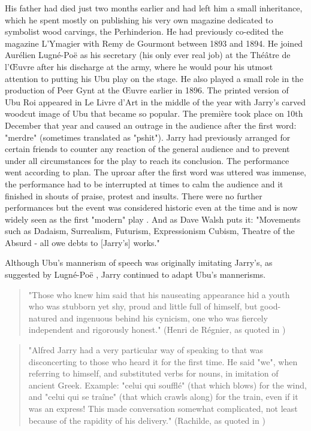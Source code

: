 His father had died just two months earlier and had left him a small inheritance, which he spent mostly on publishing his very own magazine dedicated to symbolist wood carvings, the Perhinderion. He had previously co-edited the magazine L'Ymagier with Remy de Gourmont between 1893 and 1894. He joined Aurélien Lugné-Poë as his secretary (his only ever real job) at the Théâtre de l'Œuvre after his discharge at the army, where he would pour his utmost attention to putting his Ubu play on the stage. He also played a small role in the production of Peer Gynt at the Œuvre earlier in 1896. The printed version of Ubu Roi appeared in Le Livre d'Art in the middle of the year with Jarry's carved woodcut image of Ubu that became so popular. The première took place on 10th December that year and caused an outrage in the audience after the first word: "merdre" (sometimes translated as "pshit"). Jarry had previously arranged for certain friends to counter any reaction of the general audience and to prevent under all circumstances for the play to reach its conclusion. The performance went according to plan. The uproar after the first word was uttered was immense, the performance had to be interrupted at times to calm the audience and it finished in shouts of praise, protest and insults. There were no further performances but the event was considered historic even at the time and is now widely seen as the first "modern" play \citep[p.168-169]{Brotchie2011}. And as Dave Walsh puts it: "Movements such as Dadaism, Surrealism, Futurism, Expressionism Cubism, Theatre of the Absurd - all owe debts to [Jarry's] works." \citep{Walsh2001}

Although Ubu's mannerism of speech was originally imitating Jarry's, as suggested by Lugné-Poë \citep[p.155]{Brotchie2011}, Jarry continued to adapt Ubu's mannerisms.

\begin{quote}
  "Those who knew him said that his nauseating appearance hid a youth who was stubborn yet shy, proud and little full of himself, but good-natured and ingenuous behind his cynicism, one who was fiercely independent and rigorously honest." (Henri de Régnier, as quoted in \citep[p.181]{Brotchie2011})
\end{quote}

\begin{quote}
  "Alfred Jarry had a very particular way of speaking to that was disconcerting to those who heard it for the first time. He said "we", when referring to himself, and substituted verbs for nouns, in imitation of ancient Greek. Example: "celui qui soufflé" (that which blows) for the wind, and "celui qui se traîne" (that which crawls along) for the train, even if it was an express! This made conversation somewhat complicated, not least because of the rapidity of his delivery." (Rachilde, as quoted in \citep[p.181]{Brotchie2011})
\end{quote}

